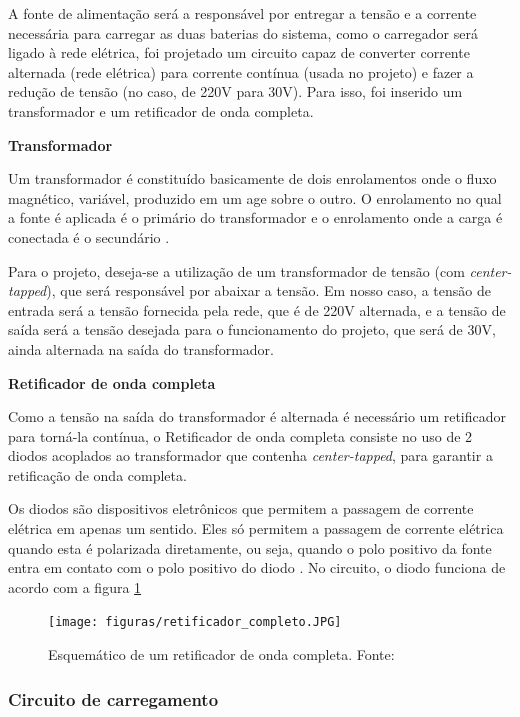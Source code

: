 A fonte de alimentação será a  responsável por entregar a tensão e a corrente necessária para carregar as duas baterias do sistema, como o carregador será ligado à rede elétrica, foi projetado um circuito capaz de converter corrente alternada (rede elétrica) para corrente contínua (usada no projeto) e fazer a redução de tensão (no caso, de 220V para 30V). Para isso, foi inserido um transformador e um retificador de onda completa.

\textbf{Transformador}
    
Um transformador é constituído basicamente de dois enrolamentos onde o fluxo magnético, variável, produzido em um age sobre o outro. O enrolamento no qual a fonte é aplicada é o primário do transformador e o enrolamento onde a carga é conectada é o secundário \cite{transformadores}.

Para o projeto, deseja-se a utilização de um transformador de tensão (com \textit{center-tapped}), que será responsável por abaixar a tensão. Em nosso caso, a tensão de entrada será a tensão fornecida pela rede, que é de 220V alternada, e a tensão de saída será a tensão desejada para o funcionamento do projeto, que será de 30V, ainda alternada na saída do transformador.

\textbf{Retificador de onda completa}

Como a tensão na saída do transformador é alternada é necessário um retificador para torná-la contínua, o Retificador de onda completa consiste no uso de 2 diodos acoplados ao transformador que contenha \textit{center-tapped}, para garantir a retificação de onda completa. 

Os diodos são dispositivos eletrônicos que permitem a passagem de corrente elétrica em apenas um sentido. Eles só permitem a passagem de corrente elétrica quando esta é polarizada diretamente, ou seja, quando o polo positivo da fonte entra em contato com o polo positivo do diodo \cite{retificador}. No circuito, o diodo funciona de acordo com a figura \ref{fig:retificador}

\begin{figure}[!h]
	\centering
		\texttt{[image: figuras/retificador\_completo.JPG]}
	\caption{Esquemático de um retificador de onda completa. Fonte: \cite{retificador}}
	\label{fig:retificador}
\end{figure}

\subsubsection{Circuito de carregamento}

